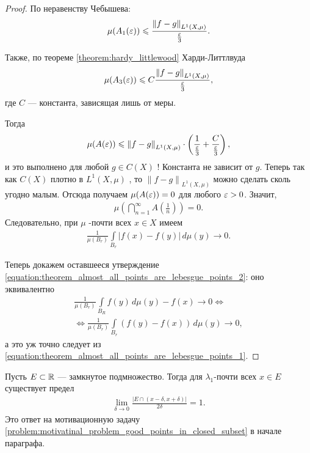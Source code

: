 \begin{proof}
 По неравенству Чебышева:
  \begin{align*}
  \mu(A_1(\varepsilon)) \leqslant \frac{\left\| f-g \right\|_{L^{1}(X,\mu)}}{\frac{\varepsilon}{3}}. \end{align*} 

  Также, по теореме \ref{theorem:hardy_littlewood} Харди-Литтлвуда \begin{align*}
   \mu(A_3(\varepsilon)) \leqslant C \frac{\left\| f - g \right\|_{L^{1}(X, \mu)}}{\frac{\varepsilon}{3}}
  ,\end{align*} где $C$ --- константа, зависящая лишь от меры.

  Тогда \begin{align*}
   \mu(A(\varepsilon)) \leqslant \left\| f - g \right\|_{L^{1}(X,\mu)} \cdot \left( \frac{1}{\frac{\varepsilon}{3}} + \frac{C}{\frac{\varepsilon}{3}} \right)
  ,\end{align*} и это выполнено для любой $g \in C(X)$ ! Константа не зависит от $g$. Теперь так как $C(X)$ плотно в  $L^{1}(X,\mu)$ , то $\left\| f-g \right\|_{L^{1}(X,\mu)}$  можно сделать сколь угодно малым. Отсюда получаем $\mu(A(\varepsilon)) = 0$ для любого  $\varepsilon > 0$. Значит,  \begin{align*}
   \mu \left( \bigcap_{n=1}^{\infty} A\left(\frac{1}{n}\right) \right) = 0
  .\end{align*} Следовательно, при $\mu$ -почти всех $x \in X$  имеем \begin{align*}
   \frac{1}{\mu(B_r)} \int\limits_{B_r} \left| f(x) - f(y) \right| \, d\mu  (y) \to 0
  .\end{align*} 

  Теперь докажем оставшееся утверждение \eqref{equation:theorem_almost_all_points_are_lebesgue_points_2}: оно эквивалентно \begin{align*}
   \frac{1}{\mu(B_r)} \int\limits_{B_R} f(y) \, d\mu  (y) - f(x) \to 0 \iff \\
   \iff \frac{1}{\mu(B_r)} \int\limits_{B_r} \left( f(y) - f(x) \right) \, d\mu (y) \to 0
  ,\end{align*} а это уж точно следует из \eqref{equation:theorem_almost_all_points_are_lebesgue_points_1}.
\end{proof}
\begin{crly}
 Пусть $E \subset \mathbb{R}$ --- замкнутое подмножество. Тогда для $\lambda_1$-почти всех $x \in E$ существует предел \begin{align*}
  \lim_{\delta \to 0} \frac{\left| E \cap (x - \delta, x + \delta) \right|}{2\delta} = 1
 .\end{align*} Это ответ на мотивационную задачу \ref{problem:motivatinal_problem_good_points_in_closed_subset} в начале параграфа.
\end{crly}
